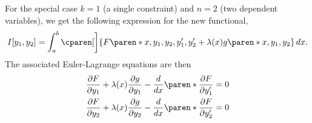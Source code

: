 \documentclass[11pt]{penrose}
\begin{document}
For the special case $k = 1$ (a single constraint) and $n = 2$ (two dependent variables), we get the following expression for the new functional,
\begin{equation}
    I[y_1, y_2] = \int_a^b \cparen[\bigg]{F\paren*{x, y_1, y_2, y'_1, y'_2} + \lambda(x) g\paren*{x, y_1, y_2}} \,dx.
\end{equation}
The associated Euler-Lagrange equations are then
\begin{gather}
    \frac{\pd F}{\pd y_1} + \lambda(x)\frac{\pd g}{\pd y_1} - \frac{d}{dx} \paren*{\frac{\pd F}{\pd y'_1}} = 0\\
    \frac{\pd F}{\pd y_2} + \lambda(x)\frac{\pd g}{\pd y_2} - \frac{d}{dx} \paren*{\frac{\pd F}{\pd y'_2}} = 0
\end{gather}
\end{document}
